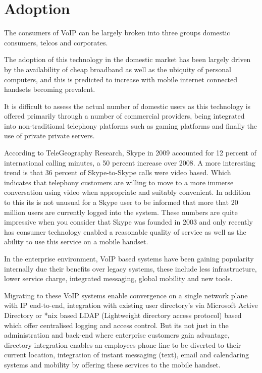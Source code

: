 \section{Adoption}
The consumers of VoIP can be largely broken into three groups domestic consumers, telcos and corporates.

The adoption of this technology in the domestic market has been largely driven by the availability of cheap broadband as well as the ubiquity of personal computers, and this is predicted to increase with mobile internet connected handsets becoming prevalent.

It is difficult to assess the actual number of domestic users as this technology is offered primarily through a number of commercial providers, being integrated into non-traditional telephony platforms such as gaming platforms and finally the use of private private servers. 

According to TeleGeography Research, Skype in 2009 accounted for 12 percent of international calling minutes, a 50 percent increase over 2008\cite{website:skype_usage}. A more interesting trend is that 36 percent of Skype-to-Skype calls were video based\cite{website:skype_usage}. Which indicates that telephony customers are willing to move to a more immerse conversation using video when appropriate and suitably convenient. In addition to this its is not unusual for a Skype user to be informed that more that 20 million users are currently logged into the system. These numbers are quite impressive when you consider that Skype was founded in 2003 and only recently has consumer technology enabled a reasonable quality of service as well as the ability to use this service on a mobile handset.

In the enterprise environment, VoIP based systems have been gaining popularity internally due their benefits over legacy systems, these include less infrastructure, lower service charge, integrated messaging, global mobility and new tools\cite{website:windows_networking_voip_enterprise}.

Migrating to these VoIP systems enable convergence on a single network plane with IP end-to-end, integration with existing user directory's via Microsoft Active Directory or *nix based LDAP (Lightweight directory access protocol) based which offer centralised logging and access control. But its not just in the administration and back-end where enterprise customers gain advantage, directory integration enables an employees phone line to be diverted to their current location, integration of instant messaging (text), email and calendaring systems and mobility by offering these services to the mobile handset.

